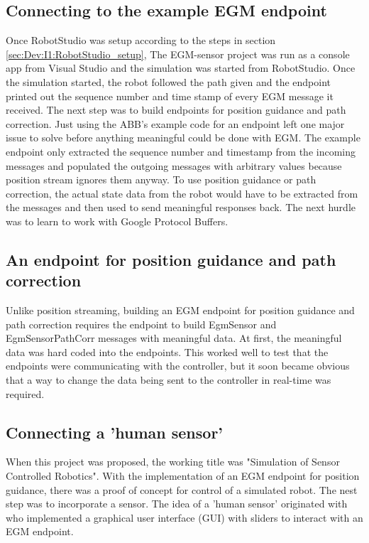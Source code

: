 \documentclass{cslthse-msc}
\begin{document}
\subsection{Connecting to the example EGM endpoint}
\label{sec:Dev:I1:conn_endpoint}
Once RobotStudio was setup according to the steps in section \ref{sec:Dev:I1:RobotStudio_setup}, The EGM-sensor project was run as a console app from Visual Studio and the simulation was started from RobotStudio. Once the simulation started, the robot followed the path given and the endpoint printed out the sequence number and time stamp of every EGM message it received. The next step was to build endpoints for position guidance and path correction. Just using the ABB's example code for an endpoint left one major issue to solve before anything meaningful could be done with EGM. The example endpoint only extracted the sequence number and timestamp from the incoming messages and populated the outgoing messages with arbitrary values because position stream ignores them anyway. To use position guidance or path correction, the actual state data from the robot would have to be extracted from the messages and then used to send meaningful responses back. The next hurdle was to learn to work with Google Protocol Buffers. \\


\subsection{An endpoint for position guidance and path correction}
\label{sec:Dev:I1:guide_corr_endpoints}
Unlike position streaming, building an EGM endpoint for position guidance and path correction requires the endpoint to build EgmSensor and EgmSensorPathCorr messages with meaningful data. At first, the meaningful data was hard coded into the endpoints. This worked well to test that the endpoints were communicating with the controller, but it soon became obvious that a way to change the data being sent to the controller in real-time was required. 

\subsection{Connecting a 'human sensor'}
\label{sec:Dev:I1:human_sensor}
When this project was proposed, the working title was "Simulation of Sensor Controlled Robotics". With the implementation of an EGM endpoint for position guidance, there was a proof of concept for control of a simulated robot. The nest step was to incorporate a sensor. The idea of a 'human sensor' originated with \cite{Castillo:YouTube} who implemented a graphical user interface (GUI) with sliders to interact with an EGM endpoint.\par
\end{document}
